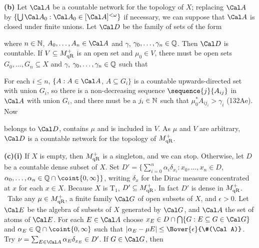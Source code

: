 {\medskip

{\bf (b)} Let $\Cal A$ be a countable network for the topology of
$X$;  replacing $\Cal A$ by
$\{\bigcup\Cal A_0:\Cal A_0\in[\Cal A]^{<\omega}\}$ if necessary,
we can suppose that $\Cal A$ is closed under finite unions.   Let $\Cal D$
be the family of sets of the form


\noindent where $n\in\Bbb N$, $A_0,\ldots,A_n\in\Cal A$ and $\gamma$,
$\gamma_0,\ldots,\gamma_n\in\Bbb Q$.   Then $\Cal D$ is countable.   If
$V\subseteq M^+_{\text{qR}}$ is an open set and $\mu_0\in V$, there must be
open sets $G_0,\ldots,G_n\subseteq X$ and $\gamma$,
$\gamma_0,\ldots,\gamma_n\in\Bbb Q$ such that


\noindent For each $i\le n$, $\{A:A\in\Cal A$, $A\subseteq G_i\}$ is a
countable upwards-directed set with union $G_i$, so there is a
non-decreasing sequence $\sequence{j}{A_{ij}}$ in $\Cal A$
with union $G_i$, and there
must be a $j_i\in\Bbb N$ such that $\mu_0^*A_{ij_i}>\gamma_i$ (132Ae).
Now


\noindent belongs to $\Cal D$, contains $\mu$ and is included in $V$.   As
$\mu$ and $V$ are arbitrary, $\Cal D$ is a countable network for the
topology of $M^+_{\text{qR}}$.

\medskip

{\bf (c)(i)} If $X$ is empty, then $M^+_{\text{qR}}$ is a
singleton, and
we can stop.   Otherwise, let $D$ be a countable dense subset of $X$.   Set
$D'=\{\sum_{i=0}^n\alpha_i\delta_{x_i}:x_0,\ldots,x_n\in D$,
$\alpha_0,\ldots,\alpha_n\in\Bbb Q\cap\coint{0,\infty}\}$, writing
$\delta_x$ for the Dirac measure concentrated at $x$ for each $x\in X$.
Because $X$ is T$_1$, $D'\subseteq M^+_{\text{qR}}$.   In fact $D'$ is dense in $M^+_{\text{qR}}$.
\Prf\ Take any $\mu\in M^+_{\text{qR}}$, a finite family $\Cal G$
of open subsets of $X$, and $\epsilon>0$.   Let $\Cal E$ be the
algebra of subsets of $X$ generated by $\Cal G$, and $\Cal A$ the set of
atoms of $\Cal E$.   For each $E\in\Cal A$ choose
$x_E\in D\cap\bigcap\{G:E\subseteq G\in\Cal G\}$ and
$\alpha_E\in\Bbb Q\cap\coint{0,\infty}$ such that
$|\alpha_E-\mu E|\le\Bover{\epsilon}{\#(\Cal A)}$.   Try
$\nu=\sum_{E\in\Cal A}\alpha_E\delta_{x_E}\in D'$.   If $G\in\Cal G$, then

}
